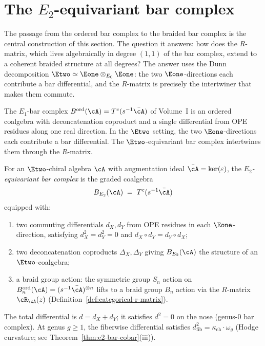 \section{The \texorpdfstring{$E_2$}{E-2}-equivariant bar complex}
\label{sec:e2-equivariant-bar}


The passage from the ordered bar complex to the braided bar complex is the central construction of this section. The question it answers: how does the $R$-matrix, which lives algebraically in degree $(1,1)$ of the bar complex, extend to a coherent braided structure at all degrees? The answer uses the Dunn decomposition $\Etwo \simeq \Eone \otimes_{E_0} \Eone$: the two $\Eone$-directions each contribute a bar differential, and the $R$-matrix is precisely the intertwiner that makes them commute.

The $E_1$-bar complex $B^{\mathrm{ord}}(\cA) = T^c(s^{-1}\bar{\cA})$
of Volume~I is an ordered coalgebra with deconcatenation coproduct and
a single differential from OPE residues along one real direction.
In the $\Etwo$ setting, the two $\Eone$-directions each contribute
a bar differential. The $\Etwo$-equivariant bar complex intertwines them
through the $R$-matrix.

\begin{definition}
\label{def:e2-equivariant-bar}
For an $\Etwo$-chiral algebra $\cA$ with augmentation ideal
$\bar{\cA} = \ker(\varepsilon)$, the \emph{$E_2$-equivariant bar
complex} is the graded coalgebra
\[
 B_{E_2}(\cA)
 \;=\;
 T^c(s^{-1}\bar{\cA})
\]
equipped with:
\begin{enumerate}[label=(\roman*)]
 \item two commuting differentials $d_X, d_Y$ from OPE residues
 in each $\Eone$-direction, satisfying $d_X^2 = d_Y^2 = 0$ and
 $d_X \circ d_Y = d_Y \circ d_X$;
 \item two deconcatenation coproducts $\Delta_X, \Delta_Y$ giving
 $B_{E_2}(\cA)$ the structure of an $\Etwo$-coalgebra;
 \item a braid group action: the symmetric group $S_n$ action on
 $B^{\mathrm{ord}}_n(\cA) = (s^{-1}\bar{\cA})^{\otimes n}$ lifts
 to a braid group $B_n$ action via the $R$-matrix
 $\cR_\cA(z)$ (Definition~\ref{def:categorical-r-matrix}).
\end{enumerate}
The total differential is $d = d_X + d_Y$; it satisfies $d^2 = 0$ on
the nose (genus-$0$ bar complex). At genus $g \geq 1$, the fiberwise
differential satisfies $d_{\mathrm{fib}}^2 = \kappa_{\mathrm{ch}} \cdot \omega_g$
(Hodge curvature; see Theorem~\ref{thm:e2-bar-cobar}(iii)).
\end{definition}

